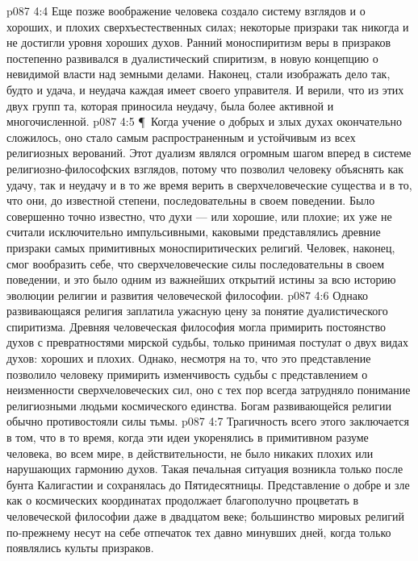 \vs p087 4:4 Еще позже воображение человека создало систему взглядов и о хороших, и плохих сверхъестественных силах; некоторые призраки так никогда и не достигли уровня хороших духов. Ранний моноспиритизм веры в призраков постепенно развивался в дуалистический спиритизм, в новую концепцию о невидимой власти над земными делами. Наконец, стали изображать дело так, будто и удача, и неудача каждая имеет своего управителя. И верили, что из этих двух групп та, которая приносила неудачу, была более активной и многочисленной.
\vs p087 4:5 \P\ Когда учение о добрых и злых духах окончательно сложилось, оно стало самым распространенным и устойчивым из всех религиозных верований. Этот дуализм являлся огромным шагом вперед в системе религиозно\hyp{}философских взглядов, потому что позволил человеку объяснять как удачу, так и неудачу и в то же время верить в сверхчеловеческие существа и в то, что они, до известной степени, последовательны в своем поведении. Было совершенно точно известно, что духи --- или хорошие, или плохие; их уже не считали исключительно импульсивными, каковыми представлялись древние призраки самых примитивных моноспиритических религий. Человек, наконец, смог вообразить себе, что сверхчеловеческие силы последовательны в своем поведении, и это было одним из важнейших открытий истины за всю историю эволюции религии и развития человеческой философии.
\vs p087 4:6 Однако развивающаяся религия заплатила ужасную цену за понятие дуалистического спиритизма. Древняя человеческая философия могла примирить постоянство духов с превратностями мирской судьбы, только принимая постулат о двух видах духов: хороших и плохих. Однако, несмотря на то, что это представление позволило человеку примирить изменчивость судьбы с представлением о неизменности сверхчеловеческих сил, оно с тех пор всегда затрудняло понимание религиозными людьми космического единства. Богам развивающейся религии обычно противостояли силы тьмы.
\vs p087 4:7 Трагичность всего этого заключается в том, что в то время, когда эти идеи укоренялись в примитивном разуме человека, во всем мире, в действительности, не было никаких плохих или нарушающих гармонию духов. Такая печальная ситуация возникла только после бунта Калигастии и сохранялась до Пятидесятницы. Представление о добре и зле как о космических координатах продолжает благополучно процветать в человеческой философии даже в двадцатом веке; большинство мировых религий по\hyp{}прежнему несут на себе отпечаток тех давно минувших дней, когда только появлялись культы призраков.
